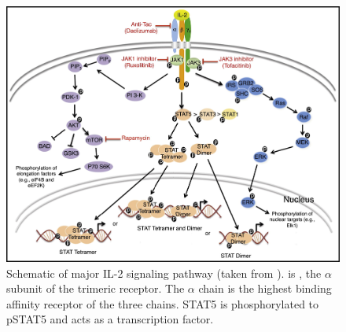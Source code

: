 \begin{figure}[h]
\centering
\includegraphics[scale=0.75]{figures/IL2-pathway.jpg}
{Schematic of major IL-2 signaling pathway (taken from \citet{Liao:2013jt}).}
{
 is , the $\alpha$ subunit of the trimeric  receptor.
The $\alpha$ chain is the highest binding affinity receptor of the three chains.
STAT5 is phosphorylated to pSTAT5 and acts as a transcription factor.
}
\end{figure}

